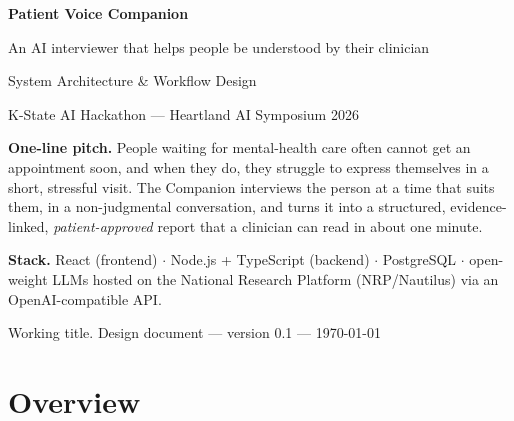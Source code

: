 \documentclass[11pt]{article}
\begin{document}

\begin{titlepage}
\centering
\vspace*{2.5cm}
{\Huge\bfseries\color{clinic} Patient Voice Companion\par}
\vspace{0.4cm}
{\Large An AI interviewer that helps people be understood by their clinician\par}
\vspace{1.2cm}
{\large System Architecture \& Workflow Design\par}
\vspace{0.3cm}
{\normalsize K-State AI Hackathon --- Heartland AI Symposium 2026\par}
\vspace{2cm}

\begin{tcolorbox}[width=0.85\textwidth,colback=backendbg,colframe=backend,boxrule=0.5pt,arc=2pt]
\small
\textbf{One-line pitch.} People waiting for mental-health care often cannot get an appointment soon, and when they do,
they struggle to express themselves in a short, stressful visit. The Companion interviews the person at a time that suits them,
in a non-judgmental conversation, and turns it into a structured, evidence-linked, \emph{patient-approved} report that a clinician
can read in about one minute.

\medskip
\textbf{Stack.} React (frontend) $\cdot$ Node.js + TypeScript (backend) $\cdot$ PostgreSQL $\cdot$
open-weight LLMs hosted on the National Research Platform (NRP/Nautilus) via an OpenAI-compatible API.
\end{tcolorbox}

\vfill
{\small Working title. Design document --- version 0.1 --- \today\par}
\end{titlepage}

\tableofcontents
\newpage

\section{Overview}
\end{document}
